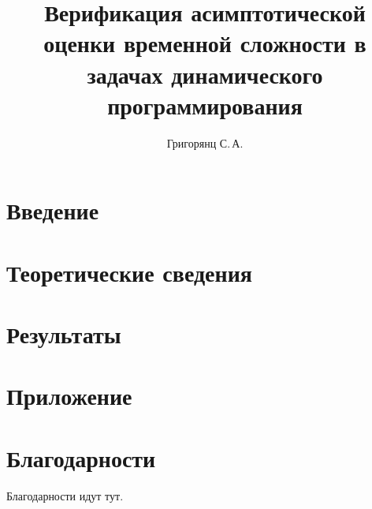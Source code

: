 \documentclass{mipt-thesis-bs}
\title{Верификация асимптотической оценки временной сложности в задачах динамического программирования}
\author{Григорянц С.\,А.}
\begin{document}
\newtheorem{lemma}{Лемма}[section]
\newtheorem{corollary}{Следствие}[section]
\newtheorem{proposition}{Утверждение}[section]
\newtheorem{remark}{Замечание}[section]
\newtheorem{fact}{Факт}[section]
\newtheorem{example}{Пример}[section]
\newtheorem{definition}{Определение}[section]

{\topsep}{\topsep}%
{\itshape}{}%
{\bfseries}{}%
{\newline}{}%
\theoremstyle{break}
\newtheorem{theorem}{Теорема}[section]


\frontmatter
\titlecontents

\mainmatter


\chapter{Введение}


\chapter{Теоретические сведения}


\chapter{Результаты}


\chapter{Приложение}



\backmatter

\printbib

\chapter{Благодарности}

Благодарности идут тут.
\end{document}
